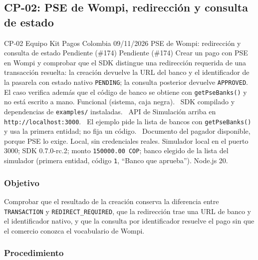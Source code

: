 \subsection{CP-02: PSE de Wompi, redirección y consulta de estado}
\label{anexo:cp02}

\FichaCaso
  {CP-02}
  {Equipo Kit Pagos Colombia}
  {09/11/2026}
  {PSE de Wompi: redirección y consulta de estado}
  {Pendiente (\#174)}
  {Pendiente (\#174)}
  {Crear un pago con PSE en Wompi y comprobar que el SDK distingue una redirección requerida de una transacción resuelta: la creación devuelve la URL del banco y el identificador de la pasarela con estado nativo \texttt{PENDING}; la consulta posterior devuelve \texttt{APPROVED}. El caso verifica además que el código de banco se obtiene con \texttt{getPseBanks()} y no está escrito a mano.}
  {Funcional (sistema, caja negra).}
  {\textbullet\ SDK compilado y dependencias de \texttt{examples/} instaladas.\newline
   \textbullet\ API de Simulación arriba en \texttt{http://localhost:3000}.\newline
   \textbullet\ El ejemplo pide la lista de bancos con \texttt{getPseBanks()} y usa la primera entidad; no fija un código.\newline
   \textbullet\ Documento del pagador disponible, porque PSE lo exige.}
  {Local, sin credenciales reales. Simulador local en el puerto 3000; SDK 0.7.0-rc.2; monto \texttt{150000.00 COP}; banco elegido de la lista del simulador (primera entidad, código \texttt{1}, ``Banco que aprueba''). Node.js 20.}

\subsubsection{Objetivo}

Comprobar que el resultado de la creación conserva la diferencia entre \texttt{TRANSACTION} y \texttt{REDIRECT\_REQUIRED}, que la redirección trae una URL de banco y el identificador nativo, y que la consulta por identificador resuelve el pago sin que el comercio conozca el vocabulario de Wompi.

\subsubsection{Procedimiento}

